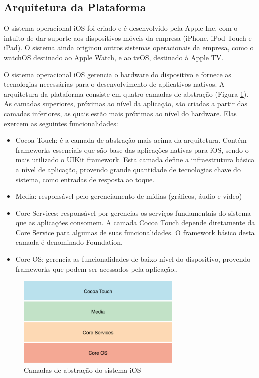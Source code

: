 \subsection{Arquitetura da Plataforma}
O sistema operacional iOS foi criado e é desenvolvido pela Apple Inc. com o intuito de dar suporte aos dispositivos móveis da empresa (iPhone, iPod Touch e iPad). O sistema ainda originou
outros sistemas operacionais da empresa, como o watchOS destinado ao Apple Watch, e ao tvOS, destinado à Apple TV. 

O sistema operacional iOS gerencia o hardware do dispositivo e fornece as tecnologias necessárias para o desenvolvimento de aplicativos nativos. A arquitetura da plataforma consiste em quatro camadas de abstração (Figura \ref{fig:ios-architecture}). As camadas superiores, próximas ao nível da aplicação, são criadas a partir das camadas inferiores, as quais estão mais próximas ao nível do hardware. Elas exercem as seguintes funcionalidades:
\begin{itemize}
    \item Cocoa Touch: é a camada de abstração mais acima da arquitetura. Contém frameworks essenciais que são base das aplicações nativas para iOS, sendo o mais utilizado o UIKit framework. Esta camada define a infraestrutura básica a nível de aplicação, provendo grande quantidade de tecnologias chave do sistema, como entradas de resposta ao toque.
    \item Media: responsável pelo gerenciamento de mídias (gráficos, áudio e vídeo)
    \item Core Services: responsável por gerencias os serviços fundamentais do sistema que as aplicações consomem. A camada Cocoa Touch depende diretamente da Core Service para algumas de suas funcionalidades. O framework básico desta camada é denominado Foundation.
    \item Core OS: gerencia as funcionalidades de baixo nível do dispositivo, provendo frameworks que podem ser acessados pela aplicação..
\end{itemize}

\begin{figure}[h]
    \centering
    \includegraphics[width=0.7\textwidth]{pfc/figuras/ios-architecture.png}
    \caption{Camadas de abstração do sistema iOS}
    \label{fig:ios-architecture}
\end{figure}

